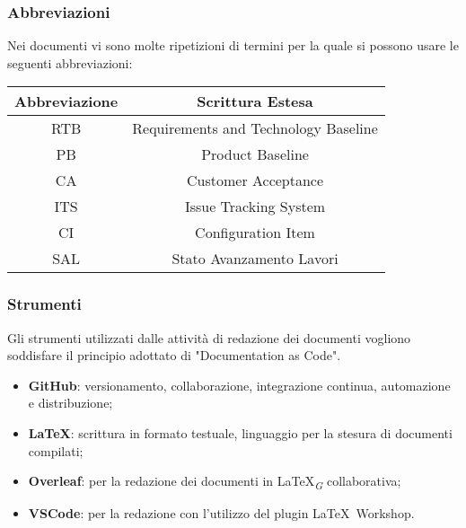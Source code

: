 \subsubsection{Abbreviazioni}
Nei documenti vi sono molte ripetizioni di termini per la quale si possono usare le seguenti abbreviazioni:\\
\vspace{0.2cm}
\begin{center}
    \begin{tabular}{|c|c|}
        \hline
        \textbf{Abbreviazione} & \textbf{Scrittura Estesa}            \\
        \hline
        RTB                    & Requirements and Technology Baseline \\
        PB                     & Product Baseline                     \\
        CA                     & Customer Acceptance                  \\
        ITS                    & Issue Tracking System                \\
        CI                     & Configuration Item                   \\
        SAL                    & Stato Avanzamento Lavori             \\   
        \hline
    \end{tabular}
\end{center}
    
\subsubsection{Strumenti}
Gli strumenti utilizzati dalle attività di redazione dei documenti vogliono soddisfare il principio adottato di "Documentation as Code".
\begin{itemize}
    \item \textbf{GitHub}: versionamento, collaborazione, integrazione continua, automazione e distribuzione;
    \item \textbf{\LaTeX}: scrittura in formato testuale, linguaggio per la stesura di documenti compilati;
    \item \textbf{Overleaf}: per la redazione dei documenti in \LaTeX\textsubscript{\textit{G}} collaborativa;
    \item \textbf{VSCode}: per la redazione con l'utilizzo del plugin \LaTeX\ Workshop.
\end{itemize}

